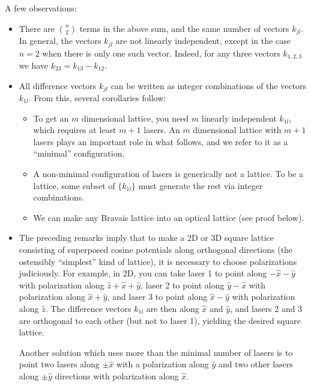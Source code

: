 \documentclass[aps,prb,floatfix,amsmath,amssymb,groupedaddress]{revtex4}
\begin{document}
A few observations:
\begin{itemize}
\item There are $\binom{n}{2}$ terms in the above sum, and the same number of vectors $k_{jl}$.  In general, the vectors $k_{jl}$ are not linearly independent, except in the case $n=2$ when there is only one such vector.   Indeed, for any three vectors $k_{1,2,3}$ we have $k_{23} = k_{13}-k_{12}$.  
\item All difference vectors $k_{jl}$ can be written as integer combinations of the vectors $k_{1l}$.  From this, several corollaries follow: 
\begin{itemize}
\item To get an $m$ dimensional lattice, you need $m$ linearly independent $k_{1l}$, which requires at least $m+1$ lasers.  An $m$ dimensional lattice with $m+1$ lasers plays an important role in what follows, and we refer to it as a ``minimal'' configuration.  
\item A non-minimal configuration of lasers is generically not a lattice.  To be a lattice, some subset of $\{k_{1l}\}$ must generate the rest via integer combinations. 
\item We can make any Bravais lattice into an optical lattice (see proof below). 
\end{itemize}
\item The preceding remarks imply that to make a 2D or 3D square lattice consisting of superposed cosine potentials along orthogonal directions (the ostensibly ``simplest'' kind of lattice), it is necessary to choose polarizations judiciously.  For example, in 2D, you can take laser 1 to point along $-\hat{x}-\hat{y}$ with polarization along $\hat{z}+\hat{x}+\hat{y}$, laser 2 to point along $\hat{y}-\hat{x}$ with polarization along $\hat{x}+\hat{y}$, and laser 3 to point along $\hat{x}-\hat{y}$ with polarization along $\hat{z}$.  The difference vectors $k_{1l}$ are then along $\hat{x}$ and $\hat{y}$, and lasers 2 and 3 are orthogonal to each other (but not to laser 1), yielding the desired square lattice.   

Another solution which uses more than the minimal number of lasers is to point two lasers along $\pm\hat{x}$ with a polarization along $\hat{y}$ and two other lasers along $\pm \hat{y}$ directions with polarization along $\hat{x}$.
\end{itemize}

\end{document}
